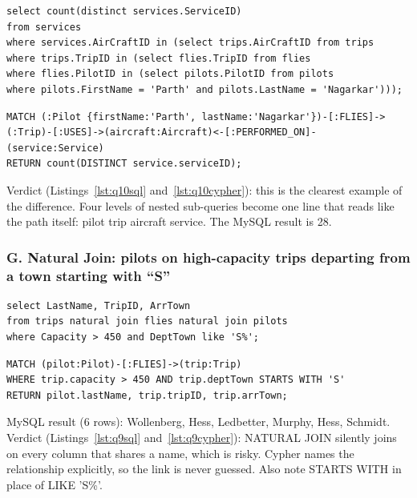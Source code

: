 \documentclass[10pt,a4paper,twocolumn]{article}
\begin{document}
\begin{lstlisting}[style=sqlcode,caption={Services on aircraft flown by one pilot, in SQL: four levels of nested sub-queries},label={lst:q10sql}]
select count(distinct services.ServiceID)
from services
where services.AirCraftID in (select trips.AirCraftID from trips
where trips.TripID in (select flies.TripID from flies
where flies.PilotID in (select pilots.PilotID from pilots
where pilots.FirstName = 'Parth' and pilots.LastName = 'Nagarkar')));
\end{lstlisting}

\begin{lstlisting}[style=cyphercode,caption={The same question in Cypher, expressed as a single path},label={lst:q10cypher}]
MATCH (:Pilot {firstName:'Parth', lastName:'Nagarkar'})-[:FLIES]->(:Trip)-[:USES]->(aircraft:Aircraft)<-[:PERFORMED_ON]-(service:Service)
RETURN count(DISTINCT service.serviceID);
\end{lstlisting}

Verdict (Listings~\ref{lst:q10sql} and~\ref{lst:q10cypher}): this is the clearest example of the difference. Four levels of nested sub-queries become one line that reads like the path itself: pilot \textrightarrow{} trip \textrightarrow{} aircraft \textrightarrow{} service. The MySQL result is 28.

\subsubsection*{G. Natural Join: pilots on high-capacity trips departing from a town starting with ``S''}

\begin{lstlisting}[style=sqlcode,caption={High-capacity trips from towns beginning with S, in SQL, using NATURAL JOIN},label={lst:q9sql}]
select LastName, TripID, ArrTown
from trips natural join flies natural join pilots
where Capacity > 450 and DeptTown like 'S%';
\end{lstlisting}

\begin{lstlisting}[style=cyphercode,caption={The same query in Cypher, naming the relationship explicitly},label={lst:q9cypher}]
MATCH (pilot:Pilot)-[:FLIES]->(trip:Trip)
WHERE trip.capacity > 450 AND trip.deptTown STARTS WITH 'S'
RETURN pilot.lastName, trip.tripID, trip.arrTown;
\end{lstlisting}

MySQL result (6 rows): Wollenberg, Hess, Ledbetter, Murphy, Hess, Schmidt. Verdict (Listings~\ref{lst:q9sql} and~\ref{lst:q9cypher}): NATURAL JOIN silently joins on every column that shares a name, which is risky. Cypher names the relationship explicitly, so the link is never guessed. Also note STARTS WITH in place of LIKE 'S\%'.
\end{document}
